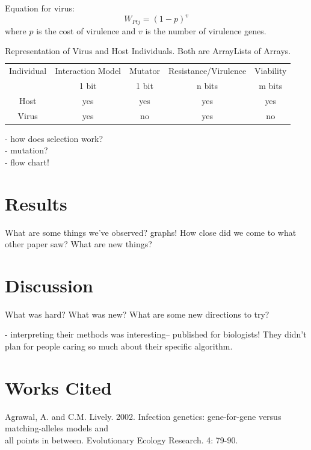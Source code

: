 \documentclass[11pt, oneside]{article}
\begin{document}
Equation for virus:
\begin{equation}
W_{Pij} = (1-p)^v
\end{equation}
where $p$ is the cost of virulence and $v$ is the number of virulence genes.

\begin{table}[H]
	\begin{center}
	 \begin{tabular}{||c c c c c||} 
	 \hline
	Individual & Interaction Model & Mutator & Resistance/Virulence & Viability\\ 
	& 1 bit & 1 bit & n bits & m bits\\
	 \hline\hline
 	Host & yes & yes & yes & yes\\
	 \hline
 	Virus & yes & no & yes & no\\
	 \hline
	\end{tabular}
	\caption{Representation of Virus and Host Individuals. Both are ArrayLists of Arrays.}
	\label{table:1}
	\end{center}
\end{table}

- how does selection work?
\\- mutation?
\\- flow chart!

\section{Results}
What are some things we've observed? graphs! How close did we come to what other paper saw? What are new things?

\section{Discussion}
What was hard? What was new? What are some new directions to try?

- interpreting their methods was interesting-- published for biologists! They didn't plan for people caring so much about their specific algorithm. 

\section{Works Cited}
Agrawal, A. and C.M. Lively. 2002. Infection genetics: gene-for-gene versus matching-alleles models and \\\-\hspace{0.75cm} all points in between. Evolutionary Ecology Research. 4: 79-90.
\end{document}
